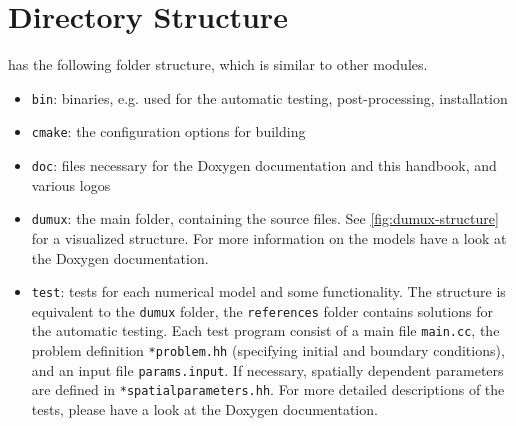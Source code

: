 \section{Directory Structure}
\label{sc_structure}

\Dumux has the following folder structure, which is similar to other \Dune modules.
\begin{itemize}
\item \texttt{bin}: binaries, e.g. used for the automatic testing, post-processing, installation
\item \texttt{cmake}: the configuration options for building \Dumux
\item \texttt{doc}: files necessary for the Doxygen documentation and this handbook, and various logos
\item \texttt{dumux}: the main folder, containing the source files. See \ref{fig:dumux-structure}
      for a visualized structure. For more information on the models have a look at the
      Doxygen documentation.
\item \texttt{test}: tests for each numerical model and some functionality.
      The structure is equivalent to the \texttt{dumux} folder, the \texttt{references} folder
      contains solutions for the automatic testing. Each test program consist of a main file
      \texttt{main.cc}, the problem definition \texttt{*problem.hh} (specifying initial and boundary
      conditions), and an input file \texttt{params.input}.
      If necessary, spatially dependent parameters are defined in \texttt{*spatialparameters.hh}.
      For more detailed descriptions of the tests, please have a look at the Doxygen documentation.
\end{itemize}

